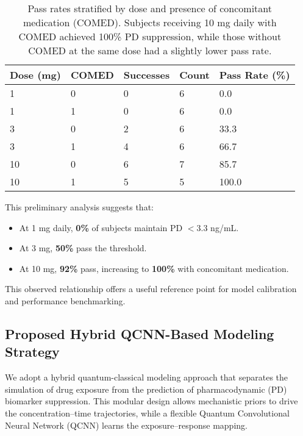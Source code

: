 \documentclass[11pt]{article}
\begin{document}
\begin{table}[H]
\centering
\renewcommand{\arraystretch}{1.3}
\begin{tabular}{p{2cm} p{2cm} p{2.5cm} p{2.5cm} p{3cm}}
\toprule
\textbf{Dose (mg)} & \textbf{COMED} & \textbf{Successes} & \textbf{Count} & \textbf{Pass Rate (\%)} \\
\midrule
1   & 0 & 0 & 6 & 0.0 \\
1   & 1 & 0 & 6 & 0.0 \\
3   & 0 & 2 & 6 & 33.3 \\
3   & 1 & 4 & 6 & 66.7 \\
10  & 0 & 6 & 7 & 85.7 \\
10  & 1 & 5 & 5 & 100.0 \\
\bottomrule
\end{tabular}
\caption{\footnotesize Pass rates stratified by dose and presence of concomitant medication (COMED). Subjects receiving 10 mg daily with COMED achieved 100\% PD suppression, while those without COMED at the same dose had a slightly lower pass rate.}
\label{tab:pass-by-dose-comed}
\end{table}



This preliminary analysis suggests that:

\begin{itemize}
    \item At 1 mg daily, \textbf{0\%} of subjects maintain PD \(< 3.3\) ng/mL.
    \item At 3 mg, \textbf{50\%} pass the threshold.
    \item At 10 mg, \textbf{92\%} pass, increasing to \textbf{100\%} with concomitant medication.
\end{itemize}

This observed relationship offers a useful reference point for model calibration and performance benchmarking.

\subsection{Proposed Hybrid QCNN-Based Modeling Strategy}

We adopt a hybrid quantum-classical modeling approach that separates the simulation of drug exposure from the prediction of pharmacodynamic (PD) biomarker suppression. This modular design allows mechanistic priors to drive the concentration–time trajectories, while a flexible Quantum Convolutional Neural Network (QCNN) learns the exposure–response mapping.
\end{document}
